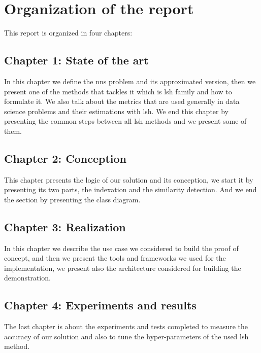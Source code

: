 \section*{Organization of the report}

This report is organized in four chapters:

\subsection*{Chapter 1: State of the art}
In this chapter we define the \acrfull{nns} problem and its approximated
version, then we present one of the methods that tackles it which is
\acrfull{lsh} family and how to formulate it. We also talk about the metrics
that are used generally in data science problems and their estimations with
\acrshort{lsh}. We end this chapter by presenting the common steps between all
\acrshort{lsh} methods and we present some of them.

\subsection*{Chapter 2: Conception}
This chapter presents the logic of our solution and its conception, we start it
by presenting its two parts, the indexation and the similarity detection. And we
end the section by presenting the class diagram.


\subsection*{Chapter 3: Realization}
In this chapter we describe the use case we considered to build the proof of
concept, and then we present the tools and frameworks we used for the
implementation, we present also the architecture considered for building the
demonstration.

\subsection*{Chapter 4: Experiments and results}
The last chapter is about the experiments and tests completed to measure the
accuracy of our solution and also to tune the hyper-parameters of the used
\acrfull{lsh} method. 


